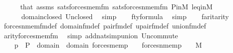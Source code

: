 \begin{isabellebody}
\ \ \ \ \isamarkupfalse%
\ that\ assms\ sats{\isacharunderscore}{\kern0pt}forces{\isacharunderscore}{\kern0pt}mem{\isacharprime}{\kern0pt}{\isacharunderscore}{\kern0pt}fm\ sats{\isacharunderscore}{\kern0pt}forces{\isacharunderscore}{\kern0pt}nmem{\isacharprime}{\kern0pt}{\isacharunderscore}{\kern0pt}fm\ P{\isacharunderscore}{\kern0pt}in{\isacharunderscore}{\kern0pt}M\ leq{\isacharunderscore}{\kern0pt}in{\isacharunderscore}{\kern0pt}M\isanewline
\ \ \ \ \ \ domain{\isacharunderscore}{\kern0pt}closed\ Un{\isacharunderscore}{\kern0pt}closed\ \isamarkupfalse%
\ simp\isanewline
\ \ \isamarkupfalse%
\ fty{\isacharcolon}{\kern0pt}{\isachardoublequoteopen}{\isacharquery}{\kern0pt}{\isasymphi}{\isasymin}formula{\isachardoublequoteclose}\ \isamarkupfalse%
\ simp\isanewline
\ \ \isamarkupfalse%
\ farit{\isacharcolon}{\kern0pt}{\isachardoublequoteopen}arity{\isacharparenleft}{\kern0pt}{\isacharquery}{\kern0pt}{\isasymphi}{\isacharparenright}{\kern0pt}{\isacharequal}{\kern0pt}{}{\isachardoublequoteclose}\isanewline
\ \ \ \ \isamarkupfalse%
\ forces{\isacharunderscore}{\kern0pt}nmem{\isacharunderscore}{\kern0pt}fm{\isacharunderscore}{\kern0pt}def\ domain{\isacharunderscore}{\kern0pt}fm{\isacharunderscore}{\kern0pt}def\ pair{\isacharunderscore}{\kern0pt}fm{\isacharunderscore}{\kern0pt}def\ upair{\isacharunderscore}{\kern0pt}fm{\isacharunderscore}{\kern0pt}def\ union{\isacharunderscore}{\kern0pt}fm{\isacharunderscore}{\kern0pt}def\isanewline
\ \ \ \ \isamarkupfalse%
\ arity{\isacharunderscore}{\kern0pt}forces{\isacharunderscore}{\kern0pt}mem{\isacharunderscore}{\kern0pt}fm\ \isamarkupfalse%
\ {\isacharparenleft}{\kern0pt}simp\ add{\isacharcolon}{\kern0pt}nat{\isacharunderscore}{\kern0pt}simp{\isacharunderscore}{\kern0pt}union\ Un{\isacharunderscore}{\kern0pt}commute{\isacharparenright}{\kern0pt}\isanewline
\ \ \ \ \isamarkupfalse%
\ \isanewline
\ \ \ \ {\isachardoublequoteopen}{\isacharbraceleft}{\kern0pt}p\ {\isasymin}\ P\ {\isachardot}{\kern0pt}\ {\isasymexists}{\isasymsigma}{\isasymin}domain{\isacharparenleft}{\kern0pt}{\isasymtau}{\isacharparenright}{\kern0pt}\ {\isasymunion}\ domain{\isacharparenleft}{\kern0pt}{\isasymtheta}{\isacharparenright}{\kern0pt}{\isachardot}{\kern0pt}\ forces{\isacharunderscore}{\kern0pt}mem{\isacharparenleft}{\kern0pt}p{\isacharcomma}{\kern0pt}\ {\isasymsigma}{\isacharcomma}{\kern0pt}\ {\isasymtau}{\isacharparenright}{\kern0pt}\ {\isasymand}\ forces{\isacharunderscore}{\kern0pt}nmem{\isacharparenleft}{\kern0pt}p{\isacharcomma}{\kern0pt}\ {\isasymsigma}{\isacharcomma}{\kern0pt}\ {\isasymtheta}{\isacharparenright}{\kern0pt}{\isacharbraceright}{\kern0pt}\ {\isasymin}\ M{\isachardoublequoteclose}\isanewline

\end{isabellebody}
